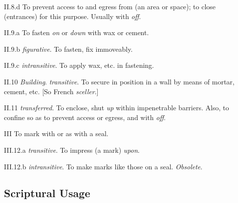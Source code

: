 \begin{compactitem}
		\item[II.8.d] To prevent access to and egress from (an area or space); to close (entrances) for this purpose. Usually with \textit{off}.
		\item[II.9.a] To fasten \textit{on} or \textit{down} with wax or cement.
		\item[II.9.b] \textit{figurative}. To fasten, fix immoveably.
		\item[II.9.c] \textit{intransitive}. To apply wax, etc. in fastening.
		\item[II.10] \textit{Building}. \textit{transitive}. To secure in position in a wall by means of mortar, cement, etc. [So French \textit{sceller}.]
		\item[II.11] \textit{transferred}. To enclose, shut \textit{up} within impenetrable barriers. Also, to confine so as to prevent access or egress, and with \textit{off}.
		\item[III] To mark with or as with a seal.
		\item[III.12.a] \textit{transitive}. To impress (a mark) \textit{upon}.
		\item[III.12.b] \textit{intransitive}. To make marks like those on a seal. \textit{Obsolete}.
	\end{compactitem}
	


\subsection{Scriptural Usage} %
	\label{SEAL-SCRIPTURES}

	
	
